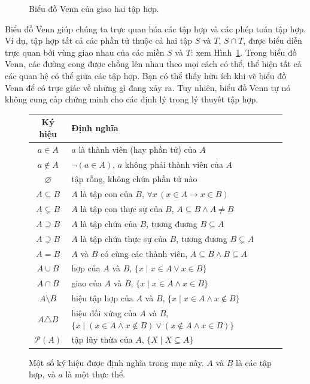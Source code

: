 \begin{figure}[ht]
\centering
{}
\caption{Biểu đồ Venn của giao hai tập hợp.}
\label{fig:4.3}
\end{figure}

Biểu đồ Venn giúp chúng ta trực quan hóa các tập hợp và các phép toán tập hợp. Ví dụ, tập hợp tất cả các phần tử thuộc cả hai tập $S$ và $T$, $S \cap T$, được biểu diễn trực quan bởi vùng giao nhau của các miền $S$ và $T$: xem Hình~\ref{fig:4.3}. Trong biểu đồ Venn, các đường cong được chồng lên nhau theo mọi cách có thể, thể hiện tất cả các quan hệ có thể giữa các tập hợp. Bạn có thể thấy hữu ích khi vẽ biểu đồ Venn để có trực giác về những gì đang xảy ra. Tuy nhiên, biểu đồ Venn tự nó không cung cấp chứng minh cho các định lý trong lý thuyết tập hợp.

\begin{figure}[ht]
\centering
\begin{tabular}{cl}
\toprule
\textbf{Ký hiệu} & \textbf{Định nghĩa} \\
\midrule
$a \in A$ & $a$ là thành viên (hay phần tử) của $A$ \\
$a \notin A$ & $\neg(a \in A)$, $a$ không phải thành viên của $A$ \\
$\varnothing$ & tập rỗng, không chứa phần tử nào \\
$A \subseteq B$ & $A$ là tập con của $B$, $\forall x\,(x \in A \to x \in B)$ \\
$A \subsetneq B$ & $A$ là tập con thực sự của $B$, $A \subseteq B \land A \neq B$ \\
$A \supseteq B$ & $A$ là tập chứa của $B$, tương đương $B \subseteq A$ \\
$A \supsetneq B$ & $A$ là tập chứa thực sự của $B$, tương đương $B \subsetneq A$ \\
$A = B$ & $A$ và $B$ có cùng các thành viên, $A \subseteq B \land B \subseteq A$ \\
$A \cup B$ & hợp của $A$ và $B$, $\{x \mid x \in A \lor x \in B\}$ \\
$A \cap B$ & giao của $A$ và $B$, $\{x \mid x \in A \land x \in B\}$ \\
$A \setminus B$ & hiệu tập hợp của $A$ và $B$, $\{x \mid x \in A \land x \notin B\}$ \\
$A \triangle B$ & hiệu đối xứng của $A$ và $B$, $\{x \mid (x \in A \land x \notin B) \lor (x \notin A \land x \in B)\}$ \\
$\mathcal{P}(A)$ & tập lũy thừa của $A$, $\{X \mid X \subseteq A\}$ \\
\bottomrule
\end{tabular}
\caption{Một số ký hiệu được định nghĩa trong mục này. $A$ và $B$ là các tập hợp, và $a$ là một thực thể.}
\label{fig:4.2}
\end{figure}

